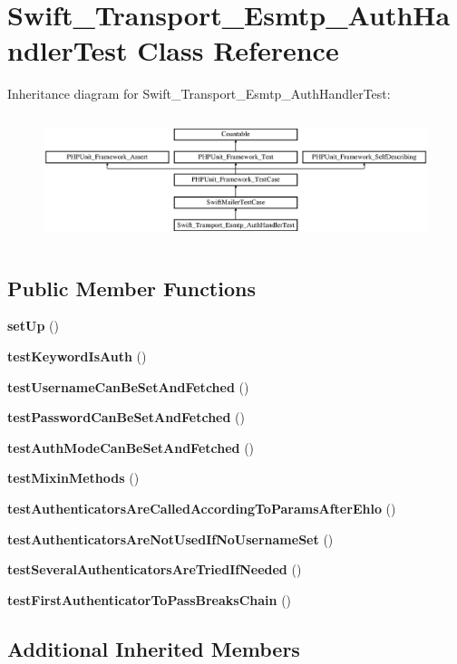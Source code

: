 \section{Swift\+\_\+\+Transport\+\_\+\+Esmtp\+\_\+\+Auth\+Handler\+Test Class Reference}
\label{class_swift___transport___esmtp___auth_handler_test}
Inheritance diagram for Swift\+\_\+\+Transport\+\_\+\+Esmtp\+\_\+\+Auth\+Handler\+Test\+:\begin{figure}[H]
\begin{center}
\leavevmode
\includegraphics[height=3.748327cm]{class_swift___transport___esmtp___auth_handler_test}
\end{center}
\end{figure}
\subsection*{Public Member Functions}
\begin{DoxyCompactItemize}
\item 
{\bf set\+Up} ()
\item 
{\bf test\+Keyword\+Is\+Auth} ()
\item 
{\bf test\+Username\+Can\+Be\+Set\+And\+Fetched} ()
\item 
{\bf test\+Password\+Can\+Be\+Set\+And\+Fetched} ()
\item 
{\bf test\+Auth\+Mode\+Can\+Be\+Set\+And\+Fetched} ()
\item 
{\bf test\+Mixin\+Methods} ()
\item 
{\bf test\+Authenticators\+Are\+Called\+According\+To\+Params\+After\+Ehlo} ()
\item 
{\bf test\+Authenticators\+Are\+Not\+Used\+If\+No\+Username\+Set} ()
\item 
{\bf test\+Several\+Authenticators\+Are\+Tried\+If\+Needed} ()
\item 
{\bf test\+First\+Authenticator\+To\+Pass\+Breaks\+Chain} ()
\end{DoxyCompactItemize}
\subsection*{Additional Inherited Members}


